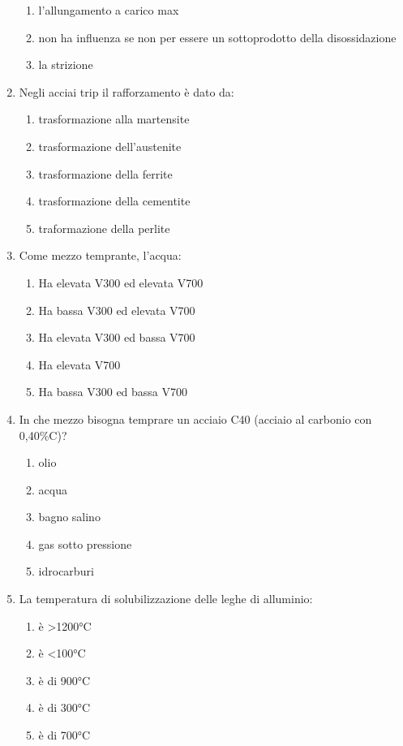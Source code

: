\begin{enumerate}
\begin{enumerate}
        \item l’allungamento a carico max
        \item non ha influenza se non per essere un sottoprodotto della disossidazione
        \item la strizione
    \end{enumerate}
    \item Negli acciai trip il rafforzamento è dato da:
    \begin{enumerate}
        \item trasformazione alla martensite
        \item trasformazione dell'austenite
        \item trasformazione della ferrite
        \item trasformazione della cementite
        \item traformazione della perlite
    \end{enumerate}
    \item Come mezzo temprante, l'acqua:
    \begin{enumerate}
        \item Ha elevata V300 ed elevata V700
        \item  Ha bassa V300 ed elevata V700
        \item  Ha elevata V300 ed bassa V700 
        \item  Ha elevata V700
        \item  Ha bassa V300 ed bassa V700
    \end{enumerate}
    \item In che mezzo bisogna temprare un acciaio C40 (acciaio al carbonio con 0,40\%C)?
    \begin{enumerate}
        \item olio
        \item acqua 
        \item bagno salino
        \item gas sotto pressione
        \item idrocarburi
    \end{enumerate}
    \item La temperatura di solubilizzazione delle leghe di alluminio:
    \begin{enumerate}
        \item è >1200°C
        \item è <100°C
        \item è di 900°C
        \item è di 300°C
        \item è di 700°C 

\end{enumerate}
\end{enumerate}
